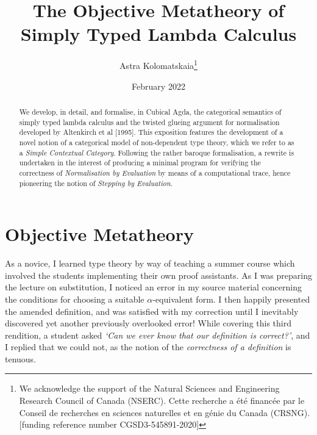 \documentclass{article}[9pt]
\title{The Objective Metatheory of Simply Typed Lambda Calculus}
\author{Astra Kolomatskaia\thanks{We acknowledge the support of the Natural
Sciences and Engineering Research Council of Canada (NSERC).
Cette recherche a \'et\'e financ\'ee par le Conseil de recherches en sciences
naturelles et en g\'enie du Canada (CRSNG).
[funding reference number CGSD3-545891-2020]}}
\date{February 2022}
\begin{document}
\maketitle

\begin{abstract}
\noindent
We develop, in detail, and formalise, in Cubical Agda, the categorical semantics
of simply typed lambda calculus and the twisted glueing argument for
normalisation developed by Altenkirch et al [1995]. This exposition features the
development of a novel notion of a categorical model of non-dependent type
theory, which we refer to as a \emph{Simple Contextual Category}. Following the
rather baroque formalisation, a rewrite is undertaken in the interest of
producing a minimal program for verifying the correctness of \emph{Normalisation
by Evaluation} by means of a computational trace, hence pioneering the notion of
\emph{Stepping by Evaluation}.
\end{abstract}

\section{Objective Metatheory}

\iffalse
Some code:
\begin{code}
{-# OPTIONS --without-K #-}

open import Agda.Builtin.String

-- A comment with some TeX ligatures:
-- --, ---, ?`, !`, `, ``, ', '', <<, >>.

Θ₁ : Set → Set
Θ₁ = λ A → A

a-name-with--hyphens : ∀ {A : Set} → A → A
a-name-with--hyphens ff--fl = ff--fl

ffi : String
ffi = "--"
\end{code}
Note that the code is indented.
\fi

As a novice, I learned type theory by way of teaching a summer course which
involved the students implementing their own proof assistants. As I was
preparing the lecture on substitution, I noticed an error in my source material
concerning the conditions for choosing a suitable $\alpha$-equivalent form. I
then happily presented the amended definition, and was satisfied with my
correction until I inevitably discovered yet another previously overlooked
error! While covering this third rendition, a student asked \textit{`Can we ever
know that our definition is correct?'}, and I replied that we could not, as the
notion of the \emph{correctness of a definition} is tenuous.
\end{document}
